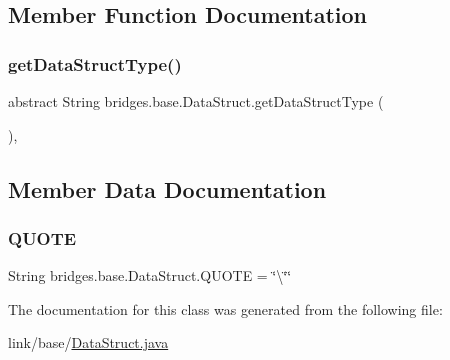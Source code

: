 \subsection{Member Function Documentation}
\hypertarget{classbridges_1_1base_1_1_data_struct_a3bae9d0d68a85e517a34be482e90fdd4}{}\label{classbridges_1_1base_1_1_data_struct_a3bae9d0d68a85e517a34be482e90fdd4} 
\subsubsection{\texorpdfstring{get\+Data\+Struct\+Type()}{getDataStructType()}}
{\footnotesize\ttfamily abstract String bridges.\+base.\+Data\+Struct.\+get\+Data\+Struct\+Type (\begin{DoxyParamCaption}{ }\end{DoxyParamCaption})\hspace{0.3cm}{\ttfamily [abstract]}, {\ttfamily [protected]}}



\subsection{Member Data Documentation}
\hypertarget{classbridges_1_1base_1_1_data_struct_aac4a6ea28f44676274120ba1dddafc1f}{}\label{classbridges_1_1base_1_1_data_struct_aac4a6ea28f44676274120ba1dddafc1f} 
\subsubsection{\texorpdfstring{Q\+U\+O\+TE}{QUOTE}}
{\footnotesize\ttfamily String bridges.\+base.\+Data\+Struct.\+Q\+U\+O\+TE = \char`\"{}\textbackslash{}\char`\"{}\char`\"{}\hspace{0.3cm}{\ttfamily [protected]}}



The documentation for this class was generated from the following file\+:\begin{DoxyCompactItemize}
\item 
link/base/\hyperlink{_data_struct_8java}{Data\+Struct.\+java}\end{DoxyCompactItemize}
